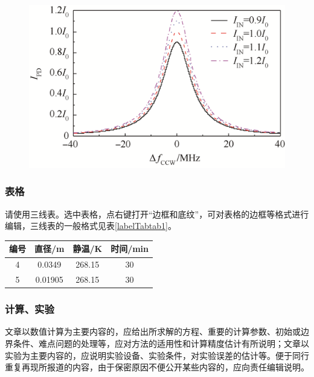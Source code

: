 \documentclass[10.5pt,twocolumn]{jbuaa}
\begin{document}
\begin{figure}[h!]
\centering
\includegraphics [scale=1,trim=0 0 0 0]{./image/tu2.png}
\end{figure}

\subsubsection{表格}
请使用三线表。选中表格，点右键打开``边框和底纹”，可对表格的边框等格式进行编辑，三线表的一般格式见表\ref{labelTabtab1}。
\begin{table}[h]
\centering
\captionnamefont{\xiaowuhao\bf }
\captiontitlefont{\xiaowuhao\bf }
\renewcommand\tabcolsep{1em}
\begin{tabular}{cccc}
\toprule
{编号} &  {直径}/\si{\metre} & {静温}/\si{\kelvin} & {时间}/min\\
\midrule 
4 & 0.0349 & 268.15 & 30\\
5 & 0.01905 & 268.15 & 30\\
\bottomrule
\end{tabular}
\end{table}

\subsubsection{计算、实验}
文章以数值计算为主要内容的，应给出所求解的方程、重要的计算参数、初始或边界条件、难点问题的处理等，应对方法的适用性和计算精度估计有所说明；文章以实验为主要内容的，应说明实验设备、实验条件，对实验误差的估计等。便于同行重复再现所报道的内容，由于保密原因不便公开某些内容的，应向责任编辑说明。
\end{document}
